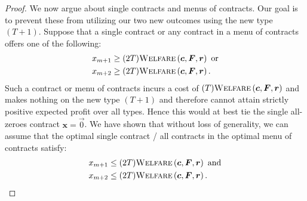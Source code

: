 \documentclass{article}
\newcommand{\costvector}{\bm{c}}
\newcommand{\ForecastTensor}{\bm{F}}
\newcommand{\rewardvector}{\bm{r}}
\newcommand{\PrincipalAgentProblem}{\left(\costvector, \ForecastTensor, \rewardvector\right)}
\newcommand{\ContractVector}{\bm{x}}
\newcommand{\contract}[1]{x_{#1}}
\newcommand{\OWelfare}{\textsc{Welfare}}
\begin{document}
\begin{proof}
  We now argue about single contracts and menus of contracts. Our goal is to prevent these from utilizing our two new outcomes using the new type $(T + 1)$. Suppose that a single contract or any contract in a menu of contracts offers one of the following:
  \begin{align*}
    \contract{m+1} &\ge (2T) \OWelfare \PrincipalAgentProblem\text{ or} \\
    \contract{m+2} &\ge (2T) \OWelfare \PrincipalAgentProblem\text{.}
  \end{align*}
  Such a contract or menu of contracts incurs a cost of $(T) \OWelfare \PrincipalAgentProblem$ and makes nothing on the new type $(T + 1)$ and therefore cannot attain strictly positive expected profit over all types. Hence this would at best tie the single all-zeroes contract $\ContractVector = \vec{0}$. We have shown that without loss of generality, we can assume that the optimal single contract / all contracts in the optimal menu of contracts satisfy:
  \begin{align*}
    \contract{m+1} &\le (2T) \OWelfare \PrincipalAgentProblem\text{ and} \\
    \contract{m+2} &\le (2T) \OWelfare \PrincipalAgentProblem\text{.}
  \end{align*}
  

\end{proof}
\end{document}
